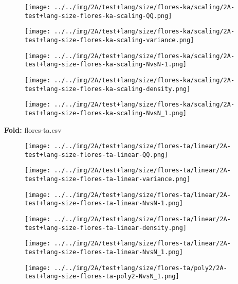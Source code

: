\begin{figure}[H]
\centering	\texttt{[image: ../../img/2A/test+lang/size/flores-ka/scaling/2A-test+lang-size-flores-ka-scaling-QQ.png]}
\end{figure}
\begin{figure}[H]
\centering	\texttt{[image: ../../img/2A/test+lang/size/flores-ka/scaling/2A-test+lang-size-flores-ka-scaling-variance.png]}
\end{figure}
\begin{figure}[H]
\centering	\texttt{[image: ../../img/2A/test+lang/size/flores-ka/scaling/2A-test+lang-size-flores-ka-scaling-NvsN-1.png]}
\end{figure}
\begin{figure}[H]
\centering	\texttt{[image: ../../img/2A/test+lang/size/flores-ka/scaling/2A-test+lang-size-flores-ka-scaling-density.png]}
\end{figure}
\begin{figure}[H]
\centering	\texttt{[image: ../../img/2A/test+lang/size/flores-ka/scaling/2A-test+lang-size-flores-ka-scaling-NvsN\_1.png]}
\end{figure}
\textbf{Fold:} flores-ta.csv
\begin{figure}[H]
\centering	\texttt{[image: ../../img/2A/test+lang/size/flores-ta/linear/2A-test+lang-size-flores-ta-linear-QQ.png]}
\end{figure}
\begin{figure}[H]
\centering	\texttt{[image: ../../img/2A/test+lang/size/flores-ta/linear/2A-test+lang-size-flores-ta-linear-variance.png]}
\end{figure}
\begin{figure}[H]
\centering	\texttt{[image: ../../img/2A/test+lang/size/flores-ta/linear/2A-test+lang-size-flores-ta-linear-NvsN-1.png]}
\end{figure}
\begin{figure}[H]
\centering	\texttt{[image: ../../img/2A/test+lang/size/flores-ta/linear/2A-test+lang-size-flores-ta-linear-density.png]}
\end{figure}
\begin{figure}[H]
\centering	\texttt{[image: ../../img/2A/test+lang/size/flores-ta/linear/2A-test+lang-size-flores-ta-linear-NvsN\_1.png]}
\end{figure}
\begin{figure}[H]
\centering	\texttt{[image: ../../img/2A/test+lang/size/flores-ta/poly2/2A-test+lang-size-flores-ta-poly2-NvsN\_1.png]}
\end{figure}
